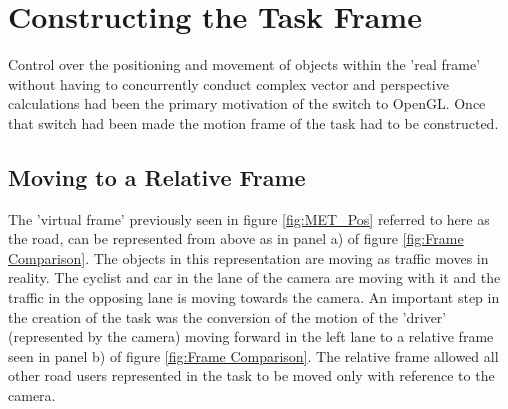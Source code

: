 \section{Constructing the Task Frame}
Control over the positioning and movement of objects within the 'real frame' without having to concurrently conduct complex vector and perspective calculations had been the primary motivation of the switch to OpenGL. Once that switch had been made the motion frame of the task had to be constructed. 

\subsection{Moving to a Relative Frame}
The 'virtual frame' previously seen in figure \ref{fig:MET_Pos} referred to here as the road, can be represented from above as in panel a) of figure \ref{fig:Frame Comparison}. The objects in this representation are moving as traffic moves in reality. The cyclist and car in the lane of the camera are moving with it and the traffic in the opposing lane is moving towards the camera. An important step in the creation of the task was the conversion of the motion of the 'driver' (represented by the camera) moving forward in the left lane to a relative frame seen in panel b) of figure \ref{fig:Frame Comparison}. The relative frame allowed all other road users represented in the task to be moved only with reference to the camera.

